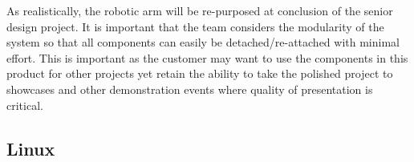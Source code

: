 As realistically, the robotic arm will be re-purposed at conclusion of the senior design project. It is important that the team considers the modularity of the system so that all components can easily be detached/re-attached with minimal effort. This is important as the customer may want to use the components in this product for other projects yet retain the ability to take the polished project to showcases and other demonstration events where quality of presentation is critical.





\subsection{Linux}
